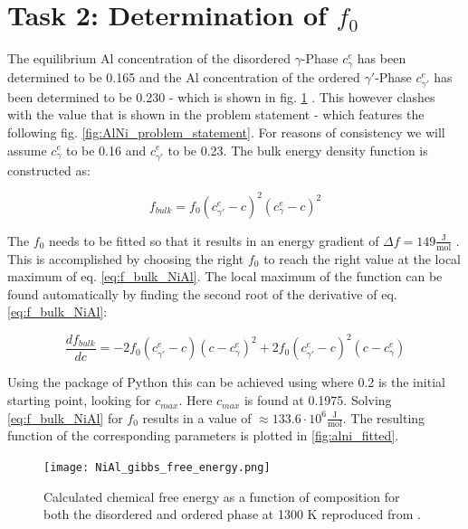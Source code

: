 \section{Task 2: Determination of \(f_{0}\)}
The equilibrium Al concentration of the disordered \(\gamma \)-Phase \(c_{\gamma}^{e}\) has been determined to be 0.165 and the  Al concentration of the ordered \(\gamma ' \)-Phase \(c_{\gamma '}^{e}\) has been determined to be 0.230 - which is shown in fig. \ref{fig:AlNi_gibbs} \cite{zhu2002}. This however clashes with the value that is shown in the problem statement \cite{zaisera} - which features the following fig. \ref{fig:AlNi_problem_statement}. For reasons of consistency we will assume \(c_{\gamma}^{e}\) to be 0.16 and \(c_{\gamma '}^{e}\) to be 0.23. The bulk energy density function is constructed as:

\begin{equation}
	f_{bulk} = f_{0} (c_{\gamma '}^{e} - c)^{2}(c_{\gamma}^{e} - c)^{2} \label{eq:f_bulk_NiAl}
\end{equation}

The \( f_{0}\) needs to be fitted so that it results in an energy gradient of \(\Delta f = 149 \frac{\mathrm{J}}{\mathrm{mol}} \) \cite{zaisera}. This is accomplished by choosing the right \(f_{0}\) to reach the right value at the local maximum of eq. \ref{eq:f_bulk_NiAl}. The local maximum of the function can be found automatically by finding the second root of the derivative of eq. \ref{eq:f_bulk_NiAl}:

\begin{equation}
	\frac{df_{bulk}}{dc} = -2 f_{0} (c_{\gamma '}^{e} - c)(c - c_{\gamma}^{e})^{2} + 2 f_{0} (c_{\gamma '}^{e} - c)^{2}(c - c_{\gamma}^{e})
\end{equation}

Using the  package of Python this can be achieved using  where 0.2 is the initial starting point, looking for \(c_{max}\). Here \(c_{max}\) is found at 0.1975. Solving \ref{eq:f_bulk_NiAl} for \(f_{0}\) results in a value of \(\approx 133.6 \cdot 10^{6} \frac{\mathrm{J}}{\mathrm{mol}}\).  The resulting function of the corresponding parameters is plotted in \ref{fig:alni_fitted}.


\begin{figure}[htb]
	\centering\texttt{[image: NiAl\_gibbs\_free\_energy.png]}
	\caption{Calculated chemical free energy as a function of composition for both the disordered and ordered phase at 1300 K reproduced from \cite{zhu2002}.}
	\label{fig:AlNi_gibbs}
\end{figure}

